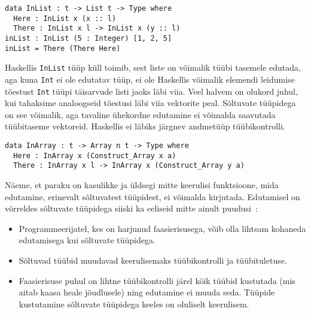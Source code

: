 \documentclass[12pt]{article}
\begin{document}
      \begin{verbatim}data InList : t -> List t -> Type where
  Here : InList x (x :: l)
  There : InList x l -> InList x (y :: l)
inList : InList (5 : Integer) [1, 2, 5]
inList = There (There Here)\end{verbatim}

      Haskellis \verb!InList! tüüp küll toimib, sest liste on võimalik tüübi tasemele edutada, aga kuna \verb!Int! ei ole edutatav tüüp, ei ole Haskellis võimalik elemendi leidumise tõestust \verb!Int! tüüpi täisarvude listi jaoks läbi viia. Veel halvem on olukord juhul, kui tahaksime analoogseid tõestusi läbi viia vektorite peal. Sõltuvate tüüpidega on see võimalik, aga tavaline ühekordne edutamine ei võimalda saavutada tüübitaseme vektoreid. Haskellis ei läbiks järgnev andmetüüp tüübikontrolli.

      \begin{verbatim}data InArray : t -> Array n t -> Type where
  Here : InArray x (Construct_Array x a)
  There : InArray x l -> InArray x (Construct_Array y a)\end{verbatim}

      Näeme, et paraku on kasulikke ja üldsegi mitte keerulisi funktsioone, mida edutamine, erinevalt sõltuvatest tüüpidest, ei võimalda kirjutada. Edutamisel on võrreldes sõltuvate tüüpidega siiski ka eeliseid mitte ainult puudusi~\cite{Giv}:

      \begin{itemize}
        \item
          Programmeerijatel, kes on harjunud faasierisusega, võib olla lihtsam kohaneda edutamisega kui sõltuvate tüüpidega.
        \item
          Sõltuvad tüübid muudavad keerulisemaks tüübikontrolli ja tüübituletuse.
        \item
          Faasierisuse puhul on lihtne tüübikontrolli järel kõik tüübid kustutada (mis aitab kaasa heale jõudlusele) ning edutamine ei muuda seda. Tüüpide kustutamine sõltuvate tüüpidega keeles on oluliselt keerulisem.
      \end{itemize}
\end{document}
